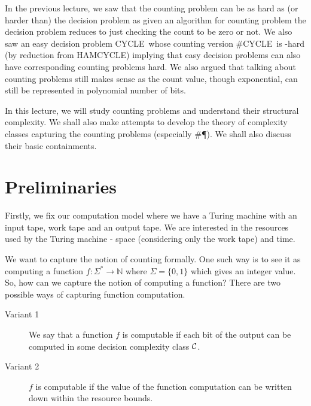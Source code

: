 \documentclass{report}
\newcommand{\CYCLE}{{\sf CYCLE~}}
\newcommand{\N}{{\mathbb{N}}}
\begin{document}
\fi



In the previous lecture, we saw that the counting problem can be as hard as (or 
harder than) the decision problem as given an algorithm for counting problem
the decision problem reduces to just checking the count to be zero or not. We
also saw an easy decision problem \CYCLE whose counting version \#\CYCLE is
\NP-hard (by reduction from {\sf HAMCYCLE}) implying that easy decision
problems can also have corresponding counting problems hard. We also argued
that talking about counting problems still makes sense as the count value,
though exponential, can still be represented in polynomial number of
bits.

In this lecture, we will study counting problems and understand their
structural complexity. We shall also make attempts to develop the theory of
complexity classes capturing the counting problems (especially \#\P). We shall
also discuss their basic containments.

\section{Preliminaries}
Firstly, we fix our computation model where we have a Turing machine with an
input tape, work tape and an output tape. We are interested in the resources
used by the Turing machine - space (considering only the work tape) and time.

We want to capture the notion of counting formally. One such way is to see it
as computing a function $f : \Sigma^* \to \N$ where $\Sigma=\{0,1\}$ which
gives an integer value. So, how can we capture the notion of computing a
function? There are two possible ways of capturing function computation.
\begin{description}
\item[Variant 1] We say that a function $f$ is computable if each bit of the
output can be computed in some decision complexity class ${\cal C}$.
\item[Variant 2] $f$ is computable if the value of the function computation
can be written down within the resource bounds.
\end{description}
\end{document}
